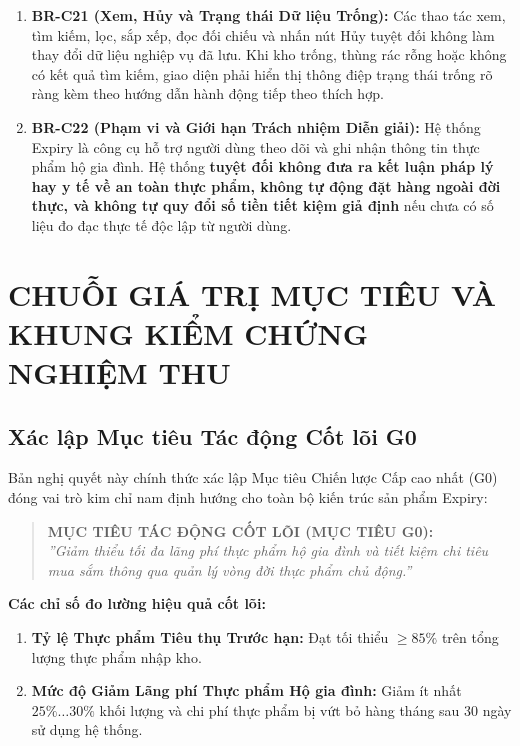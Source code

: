\documentclass[10pt,a4paper]{article}
\begin{document}
\begin{enumerate}[leftmargin=2em,itemsep=6pt]
    \item \textbf{BR-C21 (Xem, Hủy và Trạng thái Dữ liệu Trống):} Các thao tác xem, tìm kiếm, lọc, sắp xếp, đọc đối chiếu và nhấn nút Hủy tuyệt đối không làm thay đổi dữ liệu nghiệp vụ đã lưu. Khi kho trống, thùng rác rỗng hoặc không có kết quả tìm kiếm, giao diện phải hiển thị thông điệp trạng thái trống rõ ràng kèm theo hướng dẫn hành động tiếp theo thích hợp.
    \item \textbf{BR-C22 (Phạm vi và Giới hạn Trách nhiệm Diễn giải):} Hệ thống Expiry là công cụ hỗ trợ người dùng theo dõi và ghi nhận thông tin thực phẩm hộ gia đình. Hệ thống \textbf{tuyệt đối không đưa ra kết luận pháp lý hay y tế về an toàn thực phẩm, không tự động đặt hàng ngoài đời thực, và không tự quy đổi số tiền tiết kiệm giả định} nếu chưa có số liệu đo đạc thực tế độc lập từ người dùng.
\end{enumerate}

\newpage
\section{CHUỖI GIÁ TRỊ MỤC TIÊU VÀ KHUNG KIỂM CHỨNG NGHIỆM THU}

\subsection{Xác lập Mục tiêu Tác động Cốt lõi G0}
Bản nghị quyết này chính thức xác lập Mục tiêu Chiến lược Cấp cao nhất (G0) đóng vai trò kim chỉ nam định hướng cho toàn bộ kiến trúc sản phẩm Expiry:

\begin{quote}
\textbf{\color{primary}MỤC TIÊU TÁC ĐỘNG CỐT LÕI (MỤC TIÊU G0):}\\
\textit{''Giảm thiểu tối đa lãng phí thực phẩm hộ gia đình và tiết kiệm chi tiêu mua sắm thông qua quản lý vòng đời thực phẩm chủ động.''}
\end{quote}

\textbf{Các chỉ số đo lường hiệu quả cốt lõi:}
\begin{enumerate}[itemsep=2pt]
    \item \textbf{Tỷ lệ Thực phẩm Tiêu thụ Trước hạn:} Đạt tối thiểu \textbf{$\ge 85\%$} trên tổng lượng thực phẩm nhập kho.
    \item \textbf{Mức độ Giảm Lãng phí Thực phẩm Hộ gia đình:} Giảm ít nhất \textbf{$25\% \dots 30\%$} khối lượng và chi phí thực phẩm bị vứt bỏ hàng tháng sau 30 ngày sử dụng hệ thống.
\end{enumerate}
\end{document}
